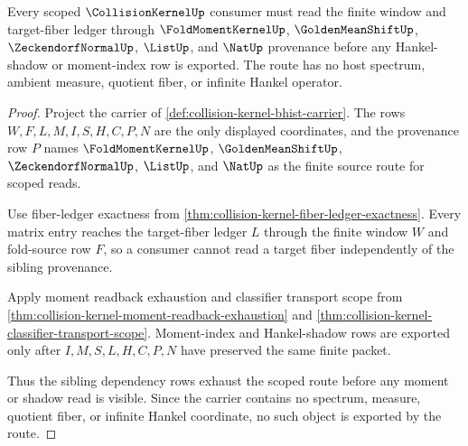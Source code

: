 \begin{theorem}
\label{thm:collision-kernel-scoped-route}
Every scoped $\CollisionKernelUp$ consumer must read the finite window and target-fiber ledger through $\FoldMomentKernelUp$, $\GoldenMeanShiftUp$, $\ZeckendorfNormalUp$, $\ListUp$, and $\NatUp$ provenance before any Hankel-shadow or moment-index row is exported. The route has no host spectrum, ambient measure, quotient fiber, or infinite Hankel operator.
\end{theorem}
\begin{proof}
Project the carrier of \autoref{def:collision-kernel-bhist-carrier}. The rows $W,F,L,M,I,S,H,C,P,N$ are the only displayed coordinates, and the provenance row $P$ names $\FoldMomentKernelUp$, $\GoldenMeanShiftUp$, $\ZeckendorfNormalUp$, $\ListUp$, and $\NatUp$ as the finite source route for scoped reads.

Use fiber-ledger exactness from \autoref{thm:collision-kernel-fiber-ledger-exactness}. Every matrix entry reaches the target-fiber ledger $L$ through the finite window $W$ and fold-source row $F$, so a consumer cannot read a target fiber independently of the sibling provenance.

Apply moment readback exhaustion and classifier transport scope from \autoref{thm:collision-kernel-moment-readback-exhaustion} and \autoref{thm:collision-kernel-classifier-transport-scope}. Moment-index and Hankel-shadow rows are exported only after $I,M,S,L,H,C,P,N$ have preserved the same finite packet.

Thus the sibling dependency rows exhaust the scoped route before any moment or shadow read is visible. Since the carrier contains no spectrum, measure, quotient fiber, or infinite Hankel coordinate, no such object is exported by the route.
\end{proof}

